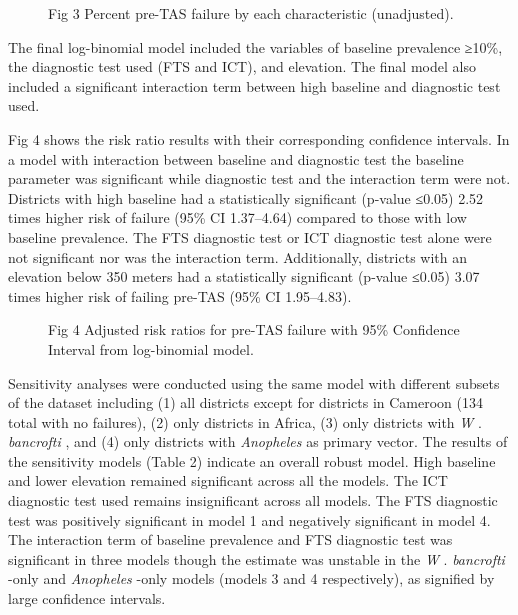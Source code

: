 \documentclass[11pt,a4paper]{article}
\begin{document}
\begin{figure}[h]
\caption{Fig 3 Percent pre-TAS failure by each characteristic (unadjusted).}
\end{figure}

The final log-binomial model included the variables of baseline prevalence ≥10\%, the diagnostic test used (FTS and ICT), and elevation. The final model also included a significant interaction term between high baseline and diagnostic test used.

Fig 4 shows the risk ratio results with their corresponding confidence intervals. In a model with interaction between baseline and diagnostic test the baseline parameter was significant while diagnostic test and the interaction term were not. Districts with high baseline had a statistically significant (p-value ≤0.05) 2.52 times higher risk of failure (95\% CI 1.37–4.64) compared to those with low baseline prevalence. The FTS diagnostic test or ICT diagnostic test alone were not significant nor was the interaction term. Additionally, districts with an elevation below 350 meters had a statistically significant (p-value ≤0.05) 3.07 times higher risk of failing pre-TAS (95\% CI 1.95–4.83).

\begin{figure}[h]
\caption{Fig 4 Adjusted risk ratios for pre-TAS failure with 95\% Confidence Interval from log-binomial model.}
\end{figure}

Sensitivity analyses were conducted using the same model with different subsets of the dataset including (1) all districts except for districts in Cameroon (134 total with no failures), (2) only districts in Africa, (3) only districts with \textit{W} . \textit{bancrofti} , and (4) only districts with \textit{Anopheles} as primary vector. The results of the sensitivity models (Table 2) indicate an overall robust model. High baseline and lower elevation remained significant across all the models. The ICT diagnostic test used remains insignificant across all models. The FTS diagnostic test was positively significant in model 1 and negatively significant in model 4. The interaction term of baseline prevalence and FTS diagnostic test was significant in three models though the estimate was unstable in the \textit{W} . \textit{bancrofti} -only and \textit{Anopheles} -only models (models 3 and 4 respectively), as signified by large confidence intervals.
\end{document}
